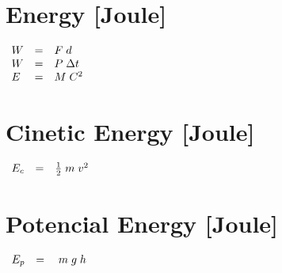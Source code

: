 \section*{Energy [Joule]}
\begin{minipage}[c]{\linewidth}
	\Large
	$\begin{array}{ l l l }
		W & = & F \; d \\
		W & = & P \; \Delta t \\
		E & = & M \; C^{2}
	\end{array}$
\end{minipage}
\newline
\section*{Cinetic Energy [Joule]}
\begin{minipage}[c]{\linewidth}
	\Large
	$\begin{array}{ l l l }
		E_{c} & = & \frac{1}{2} \; m \; v^{2}
	\end{array}$
\end{minipage}
\newline
\section*{Potencial Energy [Joule]}
\begin{minipage}[c]{\linewidth}
	\Large
	$\begin{array}{ l l l }
		E_{p} & = & \; m \; g \; h
	\end{array}$
\end{minipage}
\newline

